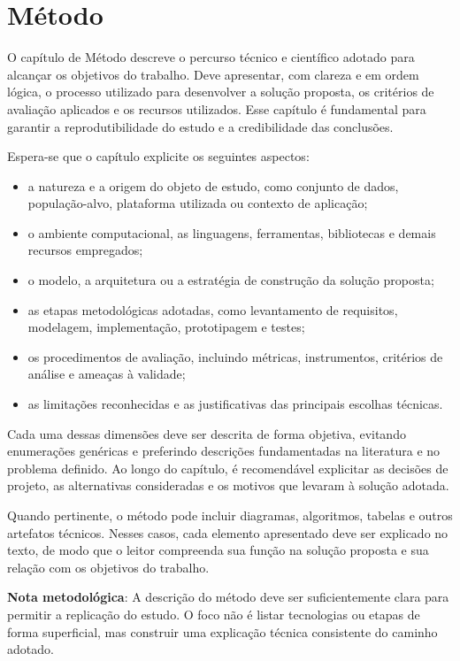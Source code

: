 \documentclass{eic-bcc-tcc}
\begin{document}
\chapter{Método}
\label{cha:metodo}

O capítulo de Método descreve o percurso técnico e científico adotado para alcançar os objetivos do trabalho. Deve apresentar, com clareza e em ordem lógica, o processo utilizado para desenvolver a solução proposta, os critérios de avaliação aplicados e os recursos utilizados. Esse capítulo é fundamental para garantir a reprodutibilidade do estudo e a credibilidade das conclusões.

Espera-se que o capítulo explicite os seguintes aspectos:
\begin{itemize}
    \item a natureza e a origem do objeto de estudo, como conjunto de dados, população-alvo, plataforma utilizada ou contexto de aplicação;
    \item o ambiente computacional, as linguagens, ferramentas, bibliotecas e demais recursos empregados;
    \item o modelo, a arquitetura ou a estratégia de construção da solução proposta;
    \item as etapas metodológicas adotadas, como levantamento de requisitos, modelagem, implementação, prototipagem e testes;
    \item os procedimentos de avaliação, incluindo métricas, instrumentos, critérios de análise e ameaças à validade;
    \item as limitações reconhecidas e as justificativas das principais escolhas técnicas.
\end{itemize}

Cada uma dessas dimensões deve ser descrita de forma objetiva, evitando enumerações genéricas e preferindo descrições fundamentadas na literatura e no problema definido. Ao longo do capítulo, é recomendável explicitar as decisões de projeto, as alternativas consideradas e os motivos que levaram à solução adotada.

Quando pertinente, o método pode incluir diagramas, algoritmos, tabelas e outros artefatos técnicos. Nesses casos, cada elemento apresentado deve ser explicado no texto, de modo que o leitor compreenda sua função na solução proposta e sua relação com os objetivos do trabalho.

\textbf{Nota metodológica}: A descrição do método deve ser suficientemente clara para permitir a replicação do estudo. O foco não é listar tecnologias ou etapas de forma superficial, mas construir uma explicação técnica consistente do caminho adotado.
\end{document}
